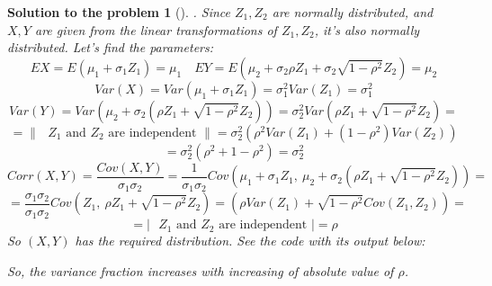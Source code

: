 \documentclass[12pt,a4]{article}
\newtheorem{solution}{Solution to the problem}
\begin{document}
\begin{solution}[] \rm .
Since $Z_1, Z_2$ are normally distributed, and $X, Y$ are given from the linear transformations of $Z_1, Z_2$, it's also normally distributed. Let's find the parameters:
\[
EX = E(\mu_1 + \sigma_1 Z_1) = \mu_1
\quad
EY = E(\mu_2 + \sigma_2 \rho Z_1 + \sigma_2\sqrt{1 − \rho^2} Z_2) = \mu_2
\]
\[
Var(X) = Var(\mu_1 + \sigma_1 Z_1) = \sigma_1^2 Var(Z_1) = \sigma_1^2
\]
\[
Var(Y) = Var\left(\mu_2+\sigma_2 (\rho Z_1 + \sqrt{1 − \rho^2} Z_2)\right)
= \sigma_2^2 Var\left(\rho Z_1 + \sqrt{1 − \rho^2} Z_2\right) =
\]
\[
= \left\| \text{ $Z_1$ and $Z_2$ are independent } \right\|
= \sigma_2^2 (\rho^2 Var(Z_1) + (1 - \rho^2)Var(Z_2))
\]
\[
= \sigma_2^2  (\rho^2  + 1 - \rho^2) = \sigma_2^2 
\]
\[
Corr(X,Y) = \frac{Cov(X,Y)}{\sigma_1 \sigma_2}
= \frac{1}{\sigma_1 \sigma_2}
Cov\left(\mu_1+\sigma_1Z_1,~\mu_2+\sigma_2(\rho Z_1 + \sqrt{1 − \rho^2} Z_2)\right) =
\]
\[
= \frac{\sigma_1 \sigma_2}{\sigma_1 \sigma_2} Cov\left(Z_1,~\rho Z_1 + \sqrt{1 − \rho^2} Z_2\right)
= (\rho Var(Z_1) + \sqrt{1 − \rho^2} Cov(Z_1,  Z_2)) =
\]
\[
= \left| \text{ $Z_1$ and $Z_2$ are independent } \right|
= \rho
\]
So $(X,Y)$ has the required distribution. See the code with its output below:

So, the variance fraction increases with increasing of absolute value of $\rho$.\\
\end{solution}
\end{document}
